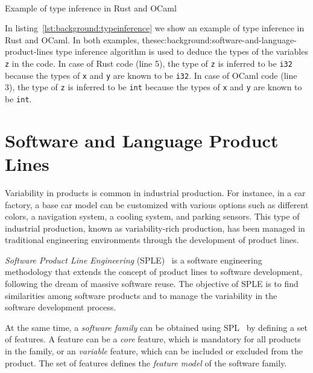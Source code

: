 \begin{Listing}[t]
    \centering
    \mbox{
        \quad
    }
    \caption{Example of type inference in Rust and OCaml}
    \label{lst:background:typeinference}
\end{Listing}

In listing~\ref{lst:background:typeinference} we show an example of type inference in Rust and OCaml. In both examples, thesec:background:software-and-language-product-lines type inference algorithm is used to deduce the types of the variables \texttt{z} in the code. In case of Rust code (line 5), the type of \texttt{z} is inferred to be \texttt{i32} because the types of \texttt{x} and \texttt{y} are known to be \texttt{i32}. In case of OCaml code (line 3), the type of \texttt{z} is inferred to be \texttt{int} because the types of \texttt{x} and \texttt{y} are known to be \texttt{int}.

\section{Software and Language Product Lines}\label{sec:background:SoftwareAndLanguageProductLines}

Variability in products is common in industrial production. For instance, in a car factory, a base car model can be customized with various options such as different colors, a navigation system, a cooling system, and parking sensors. This type of industrial production, known as variability-rich production, has been managed in traditional engineering environments through the development of product lines.

\textit{Software Product Line Engineering} (SPLE)~\cite{Van01, Van07} is a software engineering methodology that extends the concept of product lines to software development, following the dream of massive software reuse. The objective of SPLE is to find similarities among software products and to manage the variability in the software development process.

At the same time, a \textit{software family} can be obtained using SPL~\cite{Clements01} by defining a set of features. A feature can be a \textit{core} feature, which is mandatory for all products in the family, or an \textit{variable} feature, which can be included or excluded from the product. The set of features defines the \textit{feature model} of the software family.


